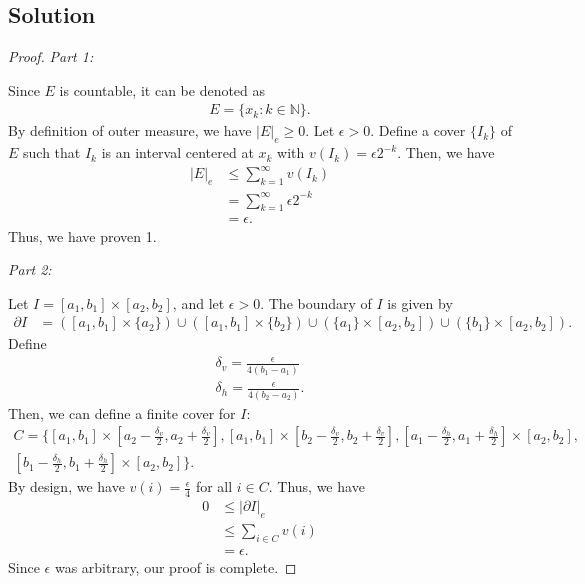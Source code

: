 \documentclass[10pt,a4paper]{article}
\makeatletter
\theoremstyle{theorem}
\newcommand{\proofpart}[2]{%
  \par
  \addvspace{\medskipamount}%
  \noindent\emph{Part #1: #2}\par\nobreak
  \addvspace{\smallskipamount}%
  \@afterheading
}
\theoremstyle{definition}
\makeatother
\begin{document}
\subsection*{Solution}
\begin{proof}
\proofpart{1}{} Since $E$ is countable, it can be denoted as 
\begin{align*}
E = \{x_k: k \in \mathbb{N}\}.
\end{align*}
By definition of outer measure, we have $|E|_e \geq 0$. Let $\epsilon > 0$. Define a cover $\{I_k \}$ of $E$ such that $I_k$ is an interval centered at $x_k$ with $v(I_k) = \epsilon 2^{-k}$. Then, we have
\begin{align*}
|E|_e &\leq \sum_{k =1}^\infty v(I_k)\\
&= \sum_{k =1}^\infty \epsilon 2^{-k}\\
&= \epsilon.
\end{align*}
Thus, we have proven 1.
\proofpart{2}{} Let $I = [a_1, b_1] \times [a_2, b_2]$, and let $\epsilon > 0$. The boundary of $I$ is given by
\begin{align*}
\partial I &= ([a_1, b_1] \times \{a_2\}) \cup ([a_1, b_1] \times \{b_2\}) \cup (\{a_1\} \times [a_2, b_2]) \cup (\{b_1\} \times [a_2, b_2]).
\end{align*}
Define \begin{align*}
\delta_v = \frac{\epsilon}{4(b_1 - a_1)}\\
\delta_h = \frac{\epsilon}{4(b_2 - a_2)}.
\end{align*}
Then, we can define a finite cover for $I$:
\begin{align*}
C = \{[a_1, b_1] \times [a_2 - \frac{\delta_v}{2}, a_2 + \frac{\delta_v}{2}], [a_1, b_1] \times [b_2 - \frac{\delta_v}{2}, b_2 + \frac{\delta_v}{2}], [a_1 - \frac{\delta_h}{2}, a_1 + \frac{\delta_h}{2}] \times [a_2, b_2],\\ [b_1 - \frac{\delta_h}{2}, b_1 + \frac{\delta_h}{2}] \times [a_2, b_2]\}.
\end{align*}
By design, we have $v(i) = \frac{\epsilon}{4}$ for all $i \in C$. Thus, we have 
\begin{align*}
0 &\leq |\partial I|_e\\
&\leq \sum_{i \in C} v(i)\\
&= \epsilon.
\end{align*}
Since $\epsilon$ was arbitrary, our proof is complete.
\end{proof}
\end{document}
